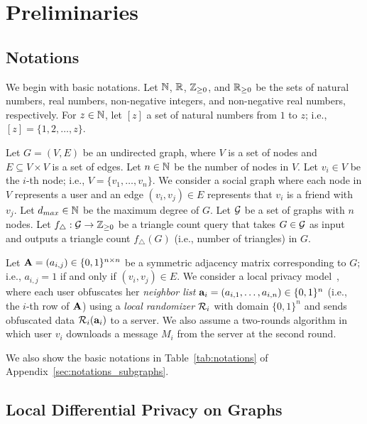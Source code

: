 \section{Preliminaries}
\label{sec:preliminaries}

\subsection{Notations}
\label{sub:notations}
We begin with basic notations. 
Let $\mathbb{N}$, $\mathbb{R}$, $\mathbb{Z}_{\ge0}$, and $\mathbb{R}_{\ge0}$ be the sets of natural numbers, real numbers, non-negative integers, and non-negative real numbers, respectively. 
For $z\in\mathbb{N}$, let $[z]$ a set of natural numbers from $1$ to $z$; i.e., $[z] = \{1, 2, \ldots, z\}$. 

Let $G=(V,E)$ be an undirected graph, where $V$ is a set of nodes and $E \subseteq V \times V$ is a set of edges. 
Let $n\in\mathbb{N}$ be the number of nodes in $V$. 
Let $v_i \in V$ be the $i$-th node; i.e., $V=\{v_1,\ldots,v_n\}$. 
We consider a social graph where each node in $V$ represents a user and an edge $(v_i,v_j) \in E$ represents that $v_i$ is a friend with $v_j$. 
Let $d_{max} \in \mathbb{N}$ be the maximum degree of $G$. 
Let $\mathcal{G}$ be a set of graphs with $n$ nodes. 
Let $f_\triangle: \mathcal{G} \rightarrow \mathbb{Z}_{\ge0}$ be a triangle 
count query 
that takes $G \in \mathcal{G}$ as input and outputs 
a triangle count $f_\triangle(G)$ (i.e., number of triangles) in $G$. 



Let $\mathbf{A}=(a_{i,j}) \in \{0,1\}^{n \times n}$ be a symmetric adjacency matrix corresponding to $G$; i.e., $a_{i,j} = 1$ if and only if $(v_i,v_j) \in E$. 
We consider a local privacy model~\cite{Qin_CCS17,Imola_USENIX21}, where each user obfuscates her \textit{neighbor list} $\mathbf{a}_i = (a_{i,1}, \ldots, a_{i,n})\in\{0,1\}^n$ (i.e., the $i$-th row of $\mathbf{A}$) using 
a \textit{local randomizer} 
$\mathcal{R}_i$ with domain $\{0,1\}^n$ and sends obfuscated data $\mathcal{R}_i(\mathbf{a}_i)$ to a server. 
We also assume a two-rounds algorithm in which user $v_i$ downloads a message $M_i$ from the server at the second round. 

We also show the basic notations in Table~\ref{tab:notations} of Appendix~\ref{sec:notations_subgraphs}.

\subsection{Local Differential Privacy on Graphs}
\label{sub:LDP}

